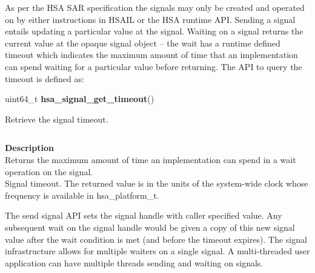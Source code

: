 \documentclass{book}
\newcommand{\hsadef}[2]{\hypertarget{#1}{\textbf{#2}}}
\newcommand{\hsatyp}[2]{\hypertarget{#1}{#2}}
\begin{document}
\vspace{3mm}As per the HSA SAR specification the signals may only be
created and operated on by either instructions in HSAIL or the HSA
runtime API.  Sending a signal entails updating a particular value at
the signal.  Waiting on a signal returns the current value at the
opaque signal object -- the wait has a runtime defined timeout which
indicates the maximum amount of time that an implementation can spend
waiting for a particular value before returning. The API to query the
timeout is defined as:

\makeatletter{}

\noindent\begin{tcolorbox}[breakable,nobeforeafter,colframe=white,colback=lightgray,left=0mm]
uint64\_t \hsadef{group__signal__timeout_1gac38679714c2c872fab1976efe1e3c021}{hsa\_signal\_get\_timeout}()

\end{tcolorbox}
Retrieve the signal timeout.

\noindent\begin{longtable}{@{}>{\hangindent=2em}p{\textwidth}}

\end{longtable}
\vspace{-5mm}\noindent\textbf{Returns}\\[1mm]
Signal timeout. The returned value is in the units of the system-wide clock whose frequency is available in \hsatyp{group__platform_1gac15087b44d735fd1479fc754de556a00}{hsa\_platform\_t}.

\noindent\begin{longtable}{@{}>{\hangindent=2em}p{\linewidth}}

\end{longtable}
\vspace{-4mm}\noindent\textbf{Description}\\[1mm]
Returns the maximum amount of time an implementation can spend in a wait operation on the signal.\\[2mm]
Signal timeout. The returned value is in the units of the system-wide clock whose frequency is available in \hsatyp{group__platform_1gac15087b44d735fd1479fc754de556a00}{hsa\_platform\_t}. 
 

The send signal API sets the signal handle with caller specified
value. Any subsequent wait on the signal handle would be given
a copy of this new signal value after the wait condition
is met (and before the timeout expires).  The signal infrastructure
allows for multiple waiters on a single signal. A multi-threaded
user application can have multiple threads sending and waiting on
signals.
\end{document}
